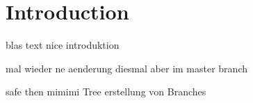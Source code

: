 \chapter{Introduction}
blas
text
nice introduktion

mal wieder ne aenderung diesmal aber im master branch

safe then
mimimi
Tree erstellung von Branches
